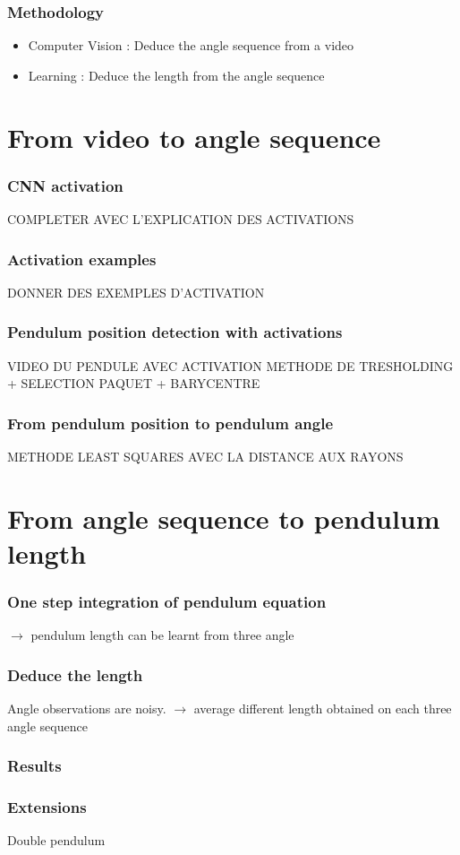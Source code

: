 \documentclass{beamer}
\begin{document}
\begin{frame}
\frametitle{Methodology}
\begin{itemize}
  \item Computer Vision : Deduce the angle sequence from a video
  \item Learning : Deduce the length from the angle sequence
\end{itemize}
\end{frame}

\section{From video to angle sequence}

\begin{frame}
\frametitle{CNN activation}
COMPLETER AVEC L'EXPLICATION DES ACTIVATIONS
\end{frame}

\begin{frame}
\frametitle{Activation examples}
DONNER DES EXEMPLES D'ACTIVATION
\end{frame}

\begin{frame}
\frametitle{Pendulum position detection with activations}
VIDEO DU PENDULE AVEC ACTIVATION
METHODE DE TRESHOLDING + SELECTION PAQUET + BARYCENTRE
\end{frame}

\begin{frame}
\frametitle{From pendulum position to pendulum angle}
METHODE LEAST SQUARES AVEC LA DISTANCE AUX RAYONS
\end{frame}

\section{From angle sequence to pendulum length}

\begin{frame}
\frametitle{One step integration of pendulum equation}
$\rightarrow$ pendulum length can be learnt from three angle
\end{frame}

\begin{frame}
\frametitle{Deduce the length}
Angle observations are noisy.
$\rightarrow$ average different length obtained on each three angle sequence
\end{frame}

\begin{frame}
\frametitle{Results}
\end{frame}

\begin{frame}
\frametitle{Extensions}
Double pendulum
\end{frame}
\end{document}
